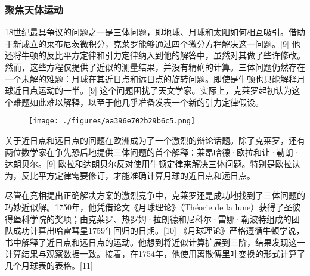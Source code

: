 \subsubsection{聚焦天体运动}  
18世纪最具争议的问题之一是三体问题，即地球、月球和太阳如何相互吸引。借助于新成立的莱布尼茨微积分，克莱罗能够通过四个微分方程解决这一问题。[9] 他还将牛顿的反比平方定律和引力定律纳入到他的解答中，虽然对其做了些许修改。然而，这些方程仅提供了近似的测量结果，并没有精确的计算。三体问题仍然存在一个未解的难题：月球在其近日点和远日点的旋转问题。即使是牛顿也只能解释月球近日点运动的一半。[9] 这个问题困扰了天文学家。实际上，克莱罗起初认为这个难题如此难以解释，以至于他几乎准备发表一个新的引力定律假设。
\begin{figure}[ht]
\centering
\texttt{[image: ./figures/aa396e702b29b6c5.png]}
\caption{} \label{fig_Alexis_3}
\end{figure}
关于近日点和远日点的问题在欧洲成为了一个激烈的辩论话题。除了克莱罗，还有两位数学家在争先恐后地提供三体问题的首个解释：莱昂哈德·欧拉和让·勒朗·达朗贝尔。[9] 欧拉和达朗贝尔反对使用牛顿定律来解决三体问题。特别是欧拉认为，反比平方定律需要修订，才能准确计算月球的近日点和远日点。

尽管在竞相提出正确解决方案的激烈竞争中，克莱罗还是成功地找到了三体问题的巧妙近似解。1750年，他凭借论文《月球理论》（Théorie de la lune）获得了圣彼得堡科学院的奖项；由克莱罗、热罗姆·拉朗德和尼科尔·雷娜·勒波特组成的团队成功计算出哈雷彗星1759年回归的日期。[10] 《月球理论》严格遵循牛顿学说，书中解释了近日点和远日点的运动。他想到将近似计算扩展到三阶，结果发现这一计算结果与观察数据一致。接着，在1754年，他使用离散傅里叶变换的形式计算了几个月球表的表格。[11]

